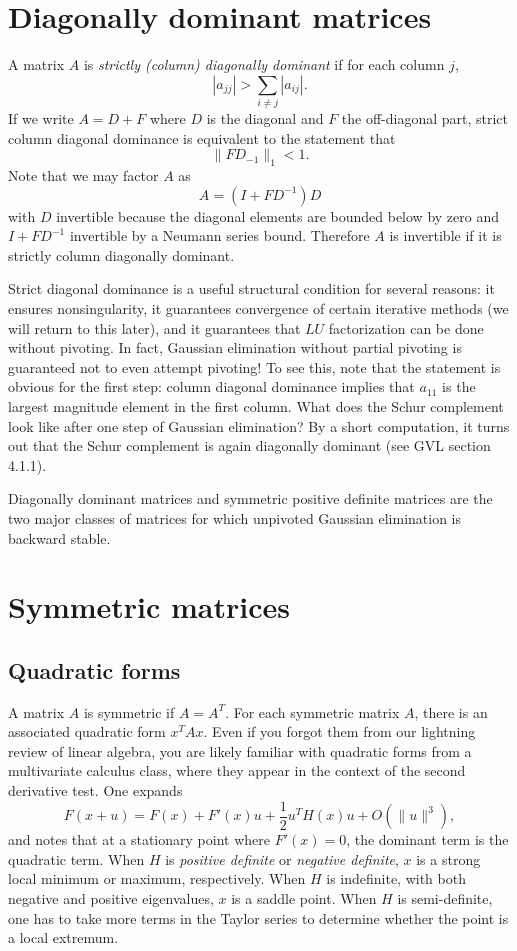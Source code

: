 \documentclass[12pt, leqno]{article} %
\begin{document}

\section{Diagonally dominant matrices}

A matrix $A$ is {\em strictly (column) diagonally dominant} if
for each column $j$,
\[
  |a_{jj}| > \sum_{i \neq j} |a_{ij}|.
\]
If we write $A = D + F$ where $D$ is the diagonal and $F$ the
off-diagonal part, strict column diagonal dominance is equivalent
to the statement that
\[
  \|FD_{-1}\|_1 < 1.
\]
Note that we may factor $A$ as
\[
  A = (I+FD^{-1}) D
\]
with $D$ invertible because the diagonal elements are bounded below
by zero and $I+FD^{-1}$ invertible by a Neumann series bound.
Therefore $A$ is invertible if it is strictly column diagonally
dominant.

Strict diagonal dominance is a useful structural condition for
several reasons: it ensures nonsingularity, it guarantees convergence
of certain iterative methods (we will return to this later), and it
guarantees that $LU$ factorization can be done without pivoting.
In fact, Gaussian elimination without partial pivoting is guaranteed
not to even attempt pivoting!  To see this, note that the statement
is obvious for the first step: column diagonal dominance implies
that $a_{11}$ is the largest magnitude element in the first column.
What does the Schur complement look like after one step of Gaussian
elimination?  By a short computation, it turns out that the Schur
complement is again diagonally dominant (see GVL section 4.1.1).

Diagonally dominant matrices and symmetric positive definite matrices
are the two major classes of matrices for which unpivoted Gaussian
elimination is backward stable.

\section{Symmetric matrices}

\subsection{Quadratic forms}

A matrix $A$ is symmetric if $A = A^T$.  For each symmetric matrix $A$,
there is an associated quadratic form $x^T A x$.  Even if you forgot
them from our lightning review of linear algebra, you are likely familiar
with quadratic forms from a multivariate calculus class, where they appear
in the context of the second derivative test.  One expands
\[
  F(x+u) = F(x) + F'(x) u + \frac{1}{2} u^T H(x) u + O(\|u\|^3),
\]
and notes that at a stationary point where $F'(x) = 0$, the dominant
term is the quadratic term.  When $H$ is {\em positive definite} or
{\em negative definite}, $x$ is a strong local minimum or maximum,
respectively. When $H$ is indefinite, with both negative and positive
eigenvalues, $x$ is a saddle point.  When $H$ is semi-definite, one has
to take more terms in the Taylor series to determine whether the point
is a local extremum.
\end{document}
